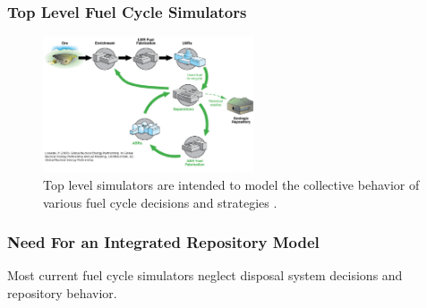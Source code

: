 

\begin{frame}[ctb!]
  \frametitle{Top Level Fuel Cycle Simulators}
  \begin{figure}[htbp!]
    \begin{center}
      \includegraphics[height=4cm]{./images/simulations.eps}
    \end{center}
    \caption{Top level simulators are intended to model the collective 
    behavior of various fuel cycle decisions and 
    strategies \cite{lisowski_global_2007}.}
    \label{fig:simulation}
  \end{figure}
\end{frame}

\begin{frame}[ctb!]
  \frametitle{Need For an Integrated Repository Model}
  \footnotesize{
  Most current fuel cycle simulators neglect disposal system decisions and 
  repository behavior. 
  
}

\end{frame}

